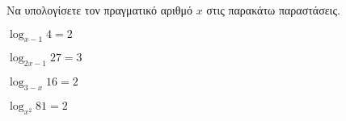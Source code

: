 Να υπολογίσετε τον πραγματικό αριθμό $ x $ στις παρακάτω παραστάσεις.
\begin{multicols}{2}
\begin{rlist}
\item $ \log_{x-1}{4}=2 $
\item $ \log_{2x-1}{27}=3 $
\item $ \log_{3-x}{16}=2 $
\item $ \log_{x^2}{81}=2 $
\end{rlist}
\end{multicols}
